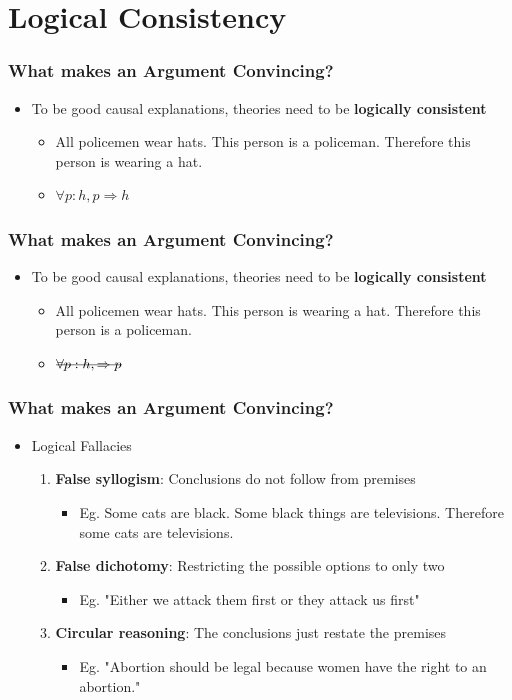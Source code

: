 \documentclass[xcolor=x11names,compress]{beamer}\usepackage[]{graphicx}\usepackage[]{color}
\renewcommand{\(}{\begin{columns}}
\renewcommand{\)}{\end{columns}}
\newcommand{\<}[1]{\begin{column}{#1}}
\renewcommand{\>}{\end{column}}
\begin{document}
\section{Logical Consistency}

\begin{frame}
\frametitle{What makes an Argument Convincing?}
\begin{itemize}
\item To be good causal explanations, theories need to be \textbf{logically consistent}
\begin{itemize}
\item All policemen wear hats. This person is a policeman. Therefore this person is wearing a hat.
\item $\forall p:  h, p \Rightarrow h$
\end{itemize}
\end{itemize}
\end{frame}

\begin{frame}
\frametitle{What makes an Argument Convincing?}
\begin{itemize}
\item To be good causal explanations, theories need to be \textbf{logically consistent}
\begin{itemize}
\item All policemen wear hats. This person is wearing a hat. Therefore this person is a policeman.
\item $\text{\sout{\ensuremath{\forall p:  h, \Rightarrow p}}}$
\end{itemize}
\end{itemize}
\end{frame}

\begin{frame}
\frametitle{What makes an Argument Convincing?}
\begin{itemize}
\item Logical Fallacies
\begin{enumerate}
\item \textbf{False syllogism}: Conclusions do not follow from premises
\begin{itemize}
\item Eg. Some cats are black. Some black things are televisions. Therefore some cats are televisions.
\end{itemize}
\item \textbf{False dichotomy}: Restricting the possible options to only two
\begin{itemize}
\item Eg. "Either we attack them first or they attack us first"
\end{itemize}
\item \textbf{Circular reasoning}: The conclusions just restate the premises
\begin{itemize}
\item Eg. "Abortion should be legal because women have the right to an abortion."
\end{itemize}
\end{enumerate}
\end{itemize}
\end{frame}
\end{document}
